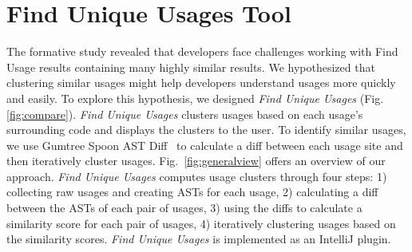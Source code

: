\documentclass[conference]{IEEEtran}
\begin{document}


\section{Find Unique Usages Tool}
The formative study revealed that developers face challenges working with Find Usage results containing many highly similar results. We hypothesized that clustering similar usages might help developers understand usages more quickly and easily. 
To explore this hypothesis, we designed \textit{Find Unique Usages} (Fig.\ref{fig:compare}). 
\textit{Find Unique Usages} clusters usages based on each usage's surrounding code and displays the clusters to the user. To identify similar usages, we use  Gumtree Spoon AST Diff~\cite{falleri2014fine} to calculate a diff between each usage site and then iteratively cluster usages. Fig.~\ref{fig:generalview} offers an overview of our approach. \textit{Find Unique Usages} computes usage clusters through four steps: 
1) collecting raw usages and creating ASTs for each usage, 2) calculating a diff between the ASTs of each pair of usages, 3) using the diffs to calculate a similarity score for each pair of usages, 4) iteratively clustering usages based on the similarity scores. \textit{Find Unique Usages} is implemented as an IntelliJ plugin.

\end{document}
